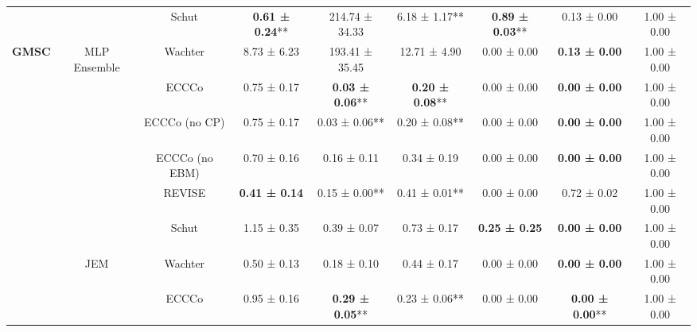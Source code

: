 \begin{table}
{\begin{tabular}[t]{>{}c|c|c|c|c|c|c|c|c}
 &  & Schut & \textbf{0.61 ± 0.24}** & 214.74 ± 34.33\hphantom{*}\hphantom{*} & 6.18 ± 1.17** & \textbf{0.89 ± 0.03}** & 0.13 ± 0.00\hphantom{*}\hphantom{*} & 1.00 ± 0.00\hphantom{*}\hphantom{*}\\

\multirow{-16}{*}{\centering\arraybackslash \textbf{GMSC}} & \multirow{-4}{*}{\centering\arraybackslash MLP Ensemble} & Wachter & 8.73 ± 6.23\hphantom{*}\hphantom{*} & 193.41 ± 35.45\hphantom{*}\hphantom{*} & 12.71 ± 4.90\hphantom{*}\hphantom{*} & 0.00 ± 0.00\hphantom{*}\hphantom{*} & \textbf{0.13 ± 0.00}\hphantom{*}\hphantom{*} & 1.00 ± 0.00\hphantom{*}\hphantom{*}\\
\cline{1-9}
 &  & ECCCo & 0.75 ± 0.17\hphantom{*}\hphantom{*} & \textbf{0.03 ± 0.06}** & \textbf{0.20 ± 0.08}** & 0.00 ± 0.00\hphantom{*}\hphantom{*} & \textbf{0.00 ± 0.00}\hphantom{*}\hphantom{*} & 1.00 ± 0.00\hphantom{*}\hphantom{*}\\

 &  & ECCCo (no CP) & 0.75 ± 0.17\hphantom{*}\hphantom{*} & 0.03 ± 0.06** & 0.20 ± 0.08** & 0.00 ± 0.00\hphantom{*}\hphantom{*} & \textbf{0.00 ± 0.00}\hphantom{*}\hphantom{*} & 1.00 ± 0.00\hphantom{*}\hphantom{*}\\

 &  & ECCCo (no EBM) & 0.70 ± 0.16\hphantom{*}\hphantom{*} & 0.16 ± 0.11\hphantom{*}\hphantom{*} & 0.34 ± 0.19\hphantom{*}\hphantom{*} & 0.00 ± 0.00\hphantom{*}\hphantom{*} & \textbf{0.00 ± 0.00}\hphantom{*}\hphantom{*} & 1.00 ± 0.00\hphantom{*}\hphantom{*}\\

 &  & REVISE & \textbf{0.41 ± 0.14}\hphantom{*}\hphantom{*} & 0.15 ± 0.00** & 0.41 ± 0.01** & 0.00 ± 0.00\hphantom{*}\hphantom{*} & 0.72 ± 0.02\hphantom{*}\hphantom{*} & 1.00 ± 0.00\hphantom{*}\hphantom{*}\\

 &  & Schut & 1.15 ± 0.35\hphantom{*}\hphantom{*} & 0.39 ± 0.07\hphantom{*}\hphantom{*} & 0.73 ± 0.17\hphantom{*}\hphantom{*} & \textbf{0.25 ± 0.25}\hphantom{*}\hphantom{*} & \textbf{0.00 ± 0.00}\hphantom{*}\hphantom{*} & 1.00 ± 0.00\hphantom{*}\hphantom{*}\\

 & \multirow{-6}{*}{\centering\arraybackslash JEM} & Wachter & 0.50 ± 0.13\hphantom{*}\hphantom{*} & 0.18 ± 0.10\hphantom{*}\hphantom{*} & 0.44 ± 0.17\hphantom{*}\hphantom{*} & 0.00 ± 0.00\hphantom{*}\hphantom{*} & \textbf{0.00 ± 0.00}\hphantom{*}\hphantom{*} & 1.00 ± 0.00\hphantom{*}\hphantom{*}\\
\cline{2-9}
 &  & ECCCo & 0.95 ± 0.16\hphantom{*}\hphantom{*} & \textbf{0.29 ± 0.05}** & 0.23 ± 0.06** & 0.00 ± 0.00\hphantom{*}\hphantom{*} & \textbf{0.00 ± 0.00}** & 1.00 ± 0.00\hphantom{*}\hphantom{*}\\


\end{tabular}}
\end{table}
